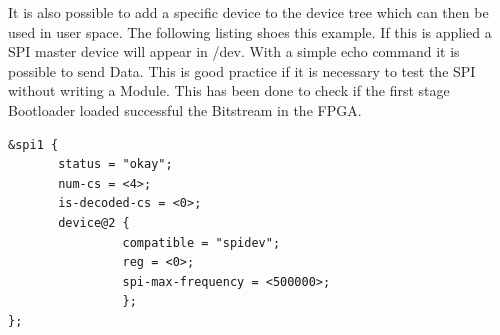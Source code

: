 It is also possible to add a specific device to the device tree which can then be used in user space. The following listing shoes this example. If this is applied a SPI master device will appear in /dev. With a simple echo command it is possible to send Data. This is good practice if it is necessary to test the SPI without writing a Module. This has been done to check if the first stage Bootloader loaded successful the Bitstream in the FPGA.

\begin{lstlisting}
&spi1 {
       status = "okay";
       num-cs = <4>;
       is-decoded-cs = <0>;
       device@2 {
                compatible = "spidev";
                reg = <0>;
                spi-max-frequency = <500000>;
                };            
};
\end{lstlisting}



